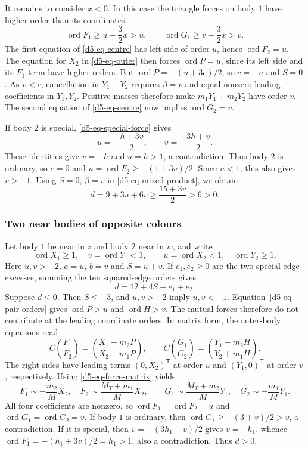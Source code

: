 \documentclass[11pt]{amsart}
\theoremstyle{definition}
\theoremstyle{remark}
\newcommand{\ord}{\operatorname{ord}}
\begin{document}
{It remains to consider $x<0$.  In this case the triangle forces on body $1$
have higher order than its coordinates:
\[
 \ord F_1\ge u-\frac32x>u,\qquad
 \ord G_1\ge v-\frac32x>v.
\]
The first equation of \eqref{d5-eq-centre} has left side of order $u$, hence
$\ord F_2=u$.  The equation for $X_2$ in \eqref{d5-eq-outer} then forces
$\ord P=u$, since its left side and its $F_1$ term have higher orders.
But $\ord P=-(u+3c)/2$, so $c=-u$ and $S=0$.
As $v<c$, cancellation in $Y_1-Y_2$ requires $\beta=v$ and equal nonzero
leading coefficients in $Y_1,Y_2$.  Positive masses therefore make
$m_1Y_1+m_2Y_2$ have order $v$.  The second equation of
\eqref{d5-eq-centre} now implies $\ord G_2=v$.

If body $2$ is special, \eqref{d5-eq-special-force} gives
\[
 u=-\frac{h+3v}{2},\qquad v=-\frac{3h+v}{2}.
\]
These identities give $v=-h$ and $u=h>1$, a contradiction.
Thus body $2$ is ordinary, so $e=0$ and
$u=\ord F_2\ge-(1+3v)/2$.  Since $u<1$, this also gives $v>-1$.
Using $S=0$, $\beta=v$ in \eqref{d5-eq-mixed-product}, we obtain
\[
 d=9+3u+6v\ge\frac{15+3v}{2}>6>0.
\]

\subsubsection{Two near bodies of opposite colours}\label{d5-opposite-near}
Let body $1$ be near in $z$ and body $2$ near in $w$, and write
\[
 \ord X_1\ge1,\quad v=\ord Y_1<1,\qquad
 u=\ord X_2<1,\quad \ord Y_2\ge1.
\]
Here $u,v>-2$, $a=u$, $b=v$ and $S=u+v$.  If $e_1,e_2\ge0$ are the two
special-edge excesses, summing the ten squared-edge orders gives
\begin{equation}\label{d5-eq-opposite-product}
 d=12+4S+e_1+e_2.
\end{equation}
Suppose $d\le0$.  Then $S\le-3$, and $u,v>-2$ imply $u,v<-1$.
Equation~\eqref{d5-eq-pair-orders} gives $\ord P>u$ and $\ord H>v$.
The mutual forces therefore do not contribute at the leading coordinate
orders.  In matrix form, the outer-body equations read
\[
 C\binom{F_1}{F_2}=\binom{X_1-m_2P}{X_2+m_1P},\qquad
 C\binom{G_1}{G_2}=\binom{Y_1-m_2H}{Y_2+m_1H}.
\]
The right sides have leading terms $(0,X_2)^{\mathsf T}$ at order $u$ and
$(Y_1,0)^{\mathsf T}$ at order $v$, respectively.  Using
\eqref{d5-eq-force-matrix} yields
\[
 F_1\sim-\frac{m_2}{M}X_2,\quad F_2\sim\frac{M_T+m_1}{M}X_2,
 \qquad
 G_1\sim\frac{M_T+m_2}{M}Y_1,\quad G_2\sim-\frac{m_1}{M}Y_1.
\]
All four coefficients are nonzero, so $\ord F_1=\ord F_2=u$ and
$\ord G_1=\ord G_2=v$.
If body $1$ is ordinary, then $\ord G_1\ge-(3+v)/2>v$, a contradiction.
If it is special, then
$v=-(3h_1+v)/2$ gives $v=-h_1$, whence
$\ord F_1=-(h_1+3v)/2=h_1>1$, also a contradiction.
Thus $d>0$.

}
\end{document}
